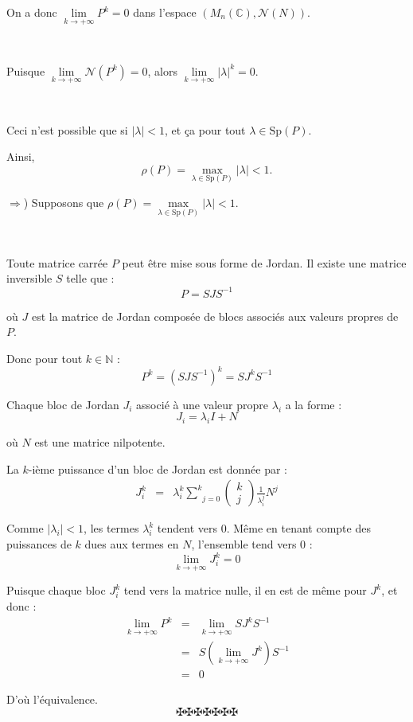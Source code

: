 On a donc $\underset{k \rightarrow + \infty}{\lim} P^k = 0$ dans l'espace
$(M_n (\mathbb{C}), \mathcal{N}(N))$.

\

Puisque $\underset{k \rightarrow + \infty}{\lim} \mathcal{N}(P^k) = 0$, alors
$\underset{k \rightarrow + \infty}{\lim} | \lambda |^k = 0$.

\

Ceci n'est possible que si $| \lambda | < 1$, et {\c c}a pour tout $\lambda
\in \mathrm{Sp} (P)$.

Ainsi,
\[ \rho (P) = \underset{\lambda \in \mathrm{Sp} (P)}{\max } | \lambda | < 1.
\]


$\Rightarrow$) Supposons que $\rho (P) = \underset{\lambda \in \mathrm{Sp}
(P)}{\max } | \lambda | < 1$.

\

Toute matrice carr{\'e}e $P$ peut {\^e}tre mise sous forme de Jordan. Il
existe une matrice inversible $S$ telle que :
\[ P = SJS^{- 1} \]


o{\`u} $J$ est la matrice de Jordan compos{\'e}e de blocs associ{\'e}s aux
valeurs propres de $P$.

Donc pour tout $k \in \mathbb{N}$ :
\[ P^k = (SJS^{- 1})^k = SJ^k S^{- 1} \]


Chaque bloc de Jordan $J_i$ associ{\'e} {\`a} une valeur propre $\lambda_i$ a
la forme :
\[ J_i = \lambda_i I + N \]


o{\`u} $N$ est une matrice nilpotente.

La $k$-i{\`e}me puissance d'un bloc de Jordan est donn{\'e}e par :
\begin{eqnarray*}
  J_i^k & = & \lambda_i^k \underset{j = 0}{\overset{k}{\sum}} \left(
  \begin{array}{c}
    k\\
    j
  \end{array} \right) \frac{1}{\lambda^j_i} N^j
\end{eqnarray*}


Comme $| \lambda_i | < 1$, les termes $\lambda_i^k$ tendent vers 0. M{\^e}me
en tenant compte des puissances de $k$ dues aux termes en $N$, l'ensemble tend
vers 0 :
\[ \underset{k \rightarrow + \infty}{\lim} J_i^k = 0 \]


Puisque chaque bloc $J_i^k$ tend vers la matrice nulle, il en est de m{\^e}me
pour $J^k$, et donc :
\begin{eqnarray*}
  \underset{k \rightarrow + \infty}{\lim} P^k & = & \underset{k \rightarrow +
  \infty}{\lim} SJ^k S^{- 1}\\
  & = & S \left( \underset{k \rightarrow + \infty}{\lim} J^k \right) S^{- 1}
  \\
  & = & 0
\end{eqnarray*}


D'o{\`u} l'{\'e}quivalence.
\[ \maltese \maltese \maltese \maltese \maltese \maltese \maltese \]
